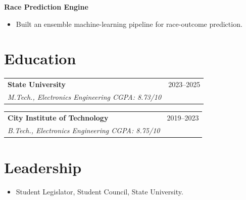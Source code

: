 \documentclass[10pt,letterpaper]{article}
\newcommand{\resumeSubheading}[4]{
\begin{tabularx}{\textwidth}{Xr}
\textbf{#1} & #2\\
\textit{#3} & \textit{#4}
\end{tabularx}
}
\begin{document}
\textbf{Race Prediction Engine}

\begin{itemize}[leftmargin=*]
\item Built an ensemble machine-learning pipeline for race-outcome prediction.
\end{itemize}

\section*{Education}

\resumeSubheading
{State University}{2023--2025}
{M.Tech., Electronics Engineering \hfill CGPA: 8.73/10}{}

\resumeSubheading
{City Institute of Technology}{2019--2023}
{B.Tech., Electronics Engineering \hfill CGPA: 8.75/10}{}

\section*{Leadership}

\begin{itemize}[leftmargin=*]
\item Student Legislator, Student Council, State University.
\end{itemize}
\end{document}
